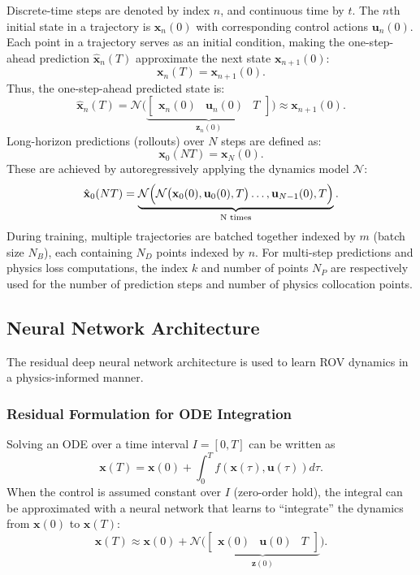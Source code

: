 \documentclass[conference]{IEEEtran}
\begin{document}
Discrete-time steps are denoted by index $n$, and continuous time by $t$. The $n$th initial state in a trajectory is $\mathbf{x}_n(0)$ with corresponding control actions $\mathbf{u}_n(0)$. Each point in a trajectory serves as an initial condition, making the one-step-ahead prediction $\hat{\mathbf{x}}_n(T)$ approximate the next state $\mathbf{x}_{n+1}(0)$:
\begin{equation}
    \mathbf{x}_{n}(T) = \mathbf{x}_{n+1}(0).
\end{equation}
Thus, the one-step-ahead predicted state is:
\begin{equation} 
    \hat{\mathbf{x}}_{n}(T) 
    =\mathcal{N}\bigl(\underbrace{\begin{bmatrix}
    \mathbf{x}_n(0) & \mathbf{u}_n(0) & T
\end{bmatrix}}_{\mathbf{z}_n(0)}\bigr)
    \approx\mathbf{x}_{n+1}(0).
\end{equation}
Long-horizon predictions (rollouts) over $N$ steps are defined as:
\begin{equation}
    \mathbf{x}_0(NT)=\mathbf{x}_N(0).
\end{equation}
These are achieved by autoregressively applying the dynamics model $\mathcal{N}$:
\begin{equation}
\label{eq:rollout_prediction}
    \hat{\mathbf{x}}_0(NT) = \underbrace{\mathcal{N} \Bigl( \mathcal{N} \bigl( \mathbf{x}_0(0), \mathbf{u}_0(0), T \bigr)\dots, \mathbf{u}_{N-1}(0), T\Bigr)}_{\text{N times}}.
\end{equation}
During training, multiple trajectories are batched together indexed by $m$ (batch size $N_B$), each containing $N_D$ points indexed by $n$. For multi-step predictions and physics loss computations, the index $k$ and number of points $N_{P}$ are respectively used for the number of prediction steps and number of physics collocation points. 

\subsection{Neural Network Architecture}
\label{sec:nn_arch}
The residual deep neural network architecture is used to learn ROV dynamics in a physics-informed manner.
\subsubsection{Residual Formulation for ODE Integration}
Solving an ODE over a time interval $I = [0,T]$ can be written as
\begin{equation}
    \mathbf{x}(T) = \mathbf{x}(0) + \int_0^T f(\mathbf{x}(\tau), \mathbf{u}(\tau)) d\tau.
\end{equation}
When the control is assumed constant over $I$ (zero-order hold), the integral can be approximated with a neural network that learns to “integrate” the dynamics from $\mathbf{x}(0)$ to $\mathbf{x}(T)$:
\begin{equation}
    \mathbf{x}(T) \approx \mathbf{x}(0) + \mathcal{N}\bigl(\underbrace{\begin{bmatrix}
    \mathbf{x}(0) & \mathbf{u}(0) & T
\end{bmatrix}}_{\mathbf{z}(0)}\bigr).
\end{equation}
\end{document}
